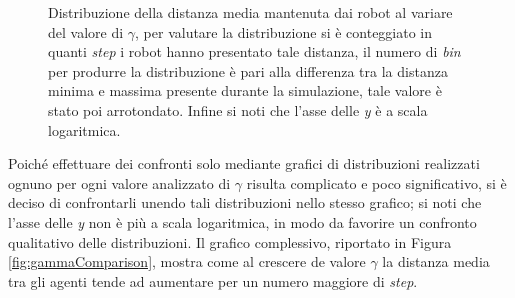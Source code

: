 \begin{figure}
	\hfill
	\caption{Distribuzione della distanza media mantenuta dai robot al variare del valore di $\gamma$, per valutare la distribuzione si è conteggiato in quanti \textit{step} i robot hanno presentato tale distanza, il numero di \textit{bin} per produrre la distribuzione è pari alla differenza tra la distanza minima e massima presente durante la simulazione, tale valore è stato poi arrotondato. Infine si noti che l'asse delle \textit{y} è a scala logaritmica.}
	\label{fig:gammaDistr}
\end{figure}
Poiché effettuare dei confronti solo mediante grafici di distribuzioni realizzati ognuno per ogni valore analizzato di $\gamma$ risulta complicato e poco significativo, si è deciso di confrontarli unendo tali distribuzioni nello stesso grafico; si noti che l'asse delle \textit{y} non è più a scala logaritmica, in modo da favorire un confronto qualitativo delle distribuzioni.
Il grafico complessivo, riportato in Figura \ref{fig:gammaComparison}, mostra come al crescere de valore $\gamma$ la distanza media tra gli agenti tende ad aumentare per un numero maggiore di \textit{step}.
